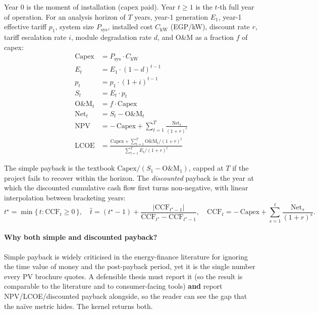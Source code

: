 Year 0 is the moment of installation (capex paid). Year $t \ge 1$ is
the $t$-th full year of operation. For an analysis horizon of $T$
years, year-1 generation $E_1$, year-1 effective tariff $p_1$, system
size $P_{\text{sys}}$, installed cost $C_{\text{kW}}$ (EGP/kW),
discount rate $r$, tariff escalation rate $i$, module degradation
rate $d$, and O\&M as a fraction $f$ of capex:
\begin{equation}
\begin{aligned}
\text{Capex}      &= P_{\text{sys}} \cdot C_{\text{kW}}                   \\
E_t               &= E_1 \cdot (1 - d)^{t-1}                              \\
p_t               &= p_1 \cdot (1 + i)^{t-1}                              \\
S_t               &= E_t \cdot p_t                                        \\
\text{O\&M}_t     &= f \cdot \text{Capex}                                 \\
\text{Net}_t      &= S_t - \text{O\&M}_t                                  \\
\mathrm{NPV}      &= -\,\text{Capex} + \sum_{t=1}^{T}
                     \frac{\text{Net}_t}{(1+r)^t}                         \\
\mathrm{LCOE}     &= \frac{\text{Capex}
                          + \sum_{t=1}^{T} \text{O\&M}_t / (1+r)^t}
                         {\sum_{t=1}^{T} E_t / (1+r)^t}
\end{aligned}
\label{eq:cashflow}
\end{equation}

The simple payback is the textbook
$\text{Capex} / (S_1 - \text{O\&M}_1)$, capped at $T$ if the project
fails to recover within the horizon. The \emph{discounted} payback is
the year at which the discounted cumulative cash flow first turns
non-negative, with linear interpolation between bracketing years:
\begin{equation}
t^{\star} = \min\bigl\{\, t : \mathrm{CCF}_t \ge 0 \,\bigr\},
\quad
\hat{t} = (t^{\star} - 1)
       + \frac{|\mathrm{CCF}_{t^{\star} - 1}|}
              {\mathrm{CCF}_{t^{\star}} - \mathrm{CCF}_{t^{\star} - 1}},
\quad
\mathrm{CCF}_t = -\,\text{Capex}
              + \sum_{s=1}^{t} \frac{\text{Net}_s}{(1+r)^s}.
\label{eq:payback}
\end{equation}

\paragraph{Why both simple and discounted payback?}
Simple payback is widely criticised in the energy-finance literature
for ignoring the time value of money and the post-payback period,
yet it is the single number every PV brochure quotes. A defensible
thesis must report it (so the result is comparable to the literature
and to consumer-facing tools) \textbf{and} report
NPV/LCOE/discounted payback alongside, so the reader can see the gap
that the na\"{i}ve metric hides. The kernel returns both.

